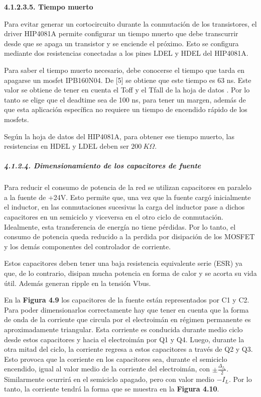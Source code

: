 \documentclass{article} %
\begin{document}
\noindent 
{\bf 4.1.2.3.5. Tiempo muerto}

\noindent Para evitar generar un cortocircuito durante la conmutaci\'{o}n de los transistores, el driver HIP4081A permite configurar un tiempo muerto que debe transcurrir desde que se apaga un transistor y se enciende el pr\'{o}ximo. Esto se configura mediante dos resistencias conectadas a los pines LDEL y HDEL del HIP4081A.

\noindent 

\noindent Para saber el tiempo muerto necesario, debe conocerse el tiempo que tarda en apagarse un mosfet IPB160N04. De [5] se obtiene que este tiempo es 63 ns. Este valor se obtiene de tener en cuenta el Toff y el Tfall de la hoja de datos . Por lo tanto se elige que el deadtime sea de 100 ns, para tener un margen, adem\'{a}s de que esta aplicaci\'{o}n espec\'{i}fica no requiere un tiempo de encendido r\'{a}pido de los mosfets.

\noindent 

\noindent Seg\'{u}n la hoja de datos del HIP4081A, para obtener ese tiempo muerto, las resistencias en HDEL y LDEL deben ser $200\ K\mathit{\Omega}$.

\noindent 
\subparagraph{4.1.2.4. Dimensionamiento de los capacitores de fuente}

\noindent Para reducir el consumo de potencia de la red se utilizan capacitores en paralelo a la fuente de +24V. Esto permite que, una vez que la fuente carg\'{o} inicialmente el inductor, en las conmutaciones sucesivas la carga del inductor pase a dichos capacitores en un semiciclo y viceversa en el otro ciclo de conmutaci\'{o}n. Idealmente, esta transferencia de energ\'{i}a no tiene p\'{e}rdidas. Por lo tanto, el consumo de potencia queda reducido a la perdida por disipaci\'{o}n de los MOSFET y los dem\'{a}s componentes del controlador de corriente. 

\noindent 

\noindent Estos capacitores deben tener una baja resistencia equivalente serie (ESR) ya que, de lo contrario, disipan mucha potencia en forma de calor y se acorta su vida \'{u}til. Adem\'{a}s generan ripple en la tensi\'{o}n Vbus.

\noindent 

\noindent En la \textbf{Figura 4.9} los capacitores de la fuente est\'{a}n representados por C1 y C2. Para poder dimensionarlos correctamente hay que tener en cuenta que la forma de onda de la corriente que circula por el electroim\'{a}n en r\'{e}gimen permanente es aproximadamente triangular. Esta corriente es conducida durante medio ciclo desde estos capacitores y hacia el electroim\'{a}n por Q1 y Q4. Luego, durante la otra mitad del ciclo, la corriente regresa a estos capacitores a trav\'{e}s de Q2 y Q3. Esto provoca que la corriente en los capacitores sea, durante el semiciclo encendido, igual al valor medio de la corriente del electroim\'{a}n, con $\pm \frac{{\mathit{\Delta}}_{I_L}}{2}$. Similarmente ocurrir\'{a} en el semiciclo apagado, pero con valor medio ${-I}_L$.  Por lo tanto,  la corriente tendr\'{a} la forma que se muestra en la \textbf{Figura 4.10}.
\end{document}
